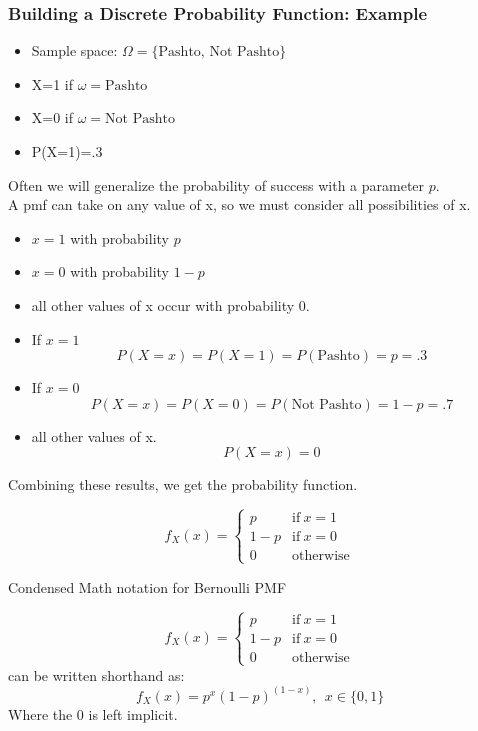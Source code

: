 \documentclass{beamer}
\numberwithin{equation}{section}
\begin{document}
\begin{frame}
\frametitle{Building a Discrete Probability Function: Example}
\begin{itemize}
\item Sample space: $\Omega= \{\text{Pashto, Not Pashto}\}$
\item X=1 if $\omega=\text{Pashto}$
\item X=0 if $\omega=\text{Not Pashto}$ 
\item P(X=1)=.3
\end{itemize}\pause
\end{frame}


\begin{frame}
Often we will generalize the probability of success with a parameter $p$.\pause \\
A pmf can take on any value of x, so we must consider all possibilities of x.
\begin{itemize}
\item $x = 1$ with probability $p$
\item $x = 0$ with probability $1-p$
\item all other values of x occur with probability 0.
\end{itemize}
\end{frame}


\begin{frame}
\begin{itemize}
\item If $x = 1$
$$P(X=x)=P(X=1)=P(\text{Pashto})=p=.3$$\pause
\item If $x = 0$
$$P(X=x)=P(X=0)=P(\text{Not Pashto})=1-p=.7$$\pause
\item all other values of x.
$$P(X=x)=0$$
\end{itemize}\pause
Combining these results, we get the probability function.

$$f_X(x)=\begin{cases}
p & \text{if}\ x=1\\
1-p & \text{if}\ x=0\\
0 & \text{otherwise}
\end{cases}$$
\end{frame}




\begin{frame}{Condensed Math notation for Bernoulli PMF}

$$f_X(x)=\begin{cases}
p & \text{if}\ x=1\\
1-p & \text{if}\ x=0\\
0 & \text{otherwise}
\end{cases}$$
can be written shorthand as:
$$f_X(x)=p^x(1-p)^{(1-x)},\ \ x\in \{0,1\}$$ 
Where the 0 is left implicit.

\end{frame}
\end{document}
